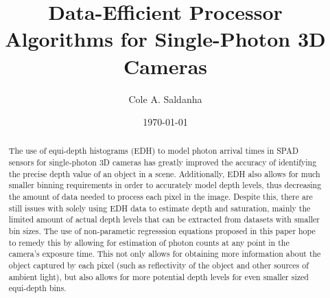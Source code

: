 \documentclass[letterpaper,12pt]{article}
\title{Data-Efficient Processor Algorithms for Single-Photon 3D Cameras}
\author{Cole A. Saldanha}
\date{\today}
\begin{document}
\maketitle

\begin{abstract}
The use of equi-depth histograms (EDH) to model photon arrival times in SPAD sensors for 
single-photon 3D cameras has greatly improved the accuracy of identifying the precise depth 
value of an object in a scene. Additionally, EDH also allows for much smaller binning requirements 
in order to accurately model depth levels, thus decreasing the amount of data needed to 
process each pixel in the image. Despite this, there are still issues with solely using EDH data 
to estimate depth and saturation, mainly the limited amount of actual depth levels that can 
be extracted from datasets with smaller bin sizes. The use of non-parametic regresssion equations 
proposed in this paper hope to remedy this by allowing for estimation of photon counts at any 
point in the camera's exposure time. This not only allows for obtaining more information about 
the object captured by each pixel (such as reflectivity of the object and other sources of 
ambient light), but also allows for more potential depth levels for even smaller sized 
equi-depth bins.
\end{abstract}
\end{document}
